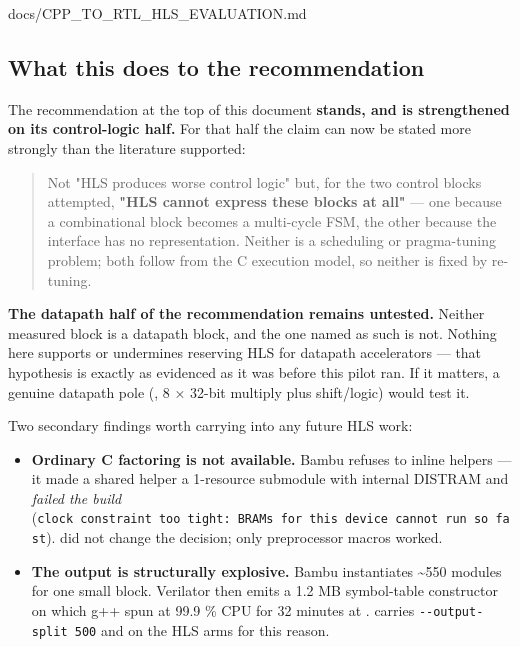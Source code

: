\begin{relocated}{docs/CPP_TO_RTL_HLS_EVALUATION.md}
\subsection{What this does to the recommendation}\label{tm:dec:cpp-to-rtl-hls-evaluation:what-this-does-to-the-recommendation}

The recommendation at the top of this document \textbf{stands, and is
strengthened on its control-logic half.} For that half the claim can now
be stated more strongly than the literature supported:

\begin{quote}
Not "HLS produces worse control logic" but, for the two control blocks
attempted, \textbf{"HLS cannot express these blocks at all"} --- one
because a combinational block becomes a multi-cycle FSM, the other
because the interface has no representation. Neither is a scheduling or
pragma-tuning problem; both follow from the C execution model, so
neither is fixed by re-tuning.
\end{quote}

\textbf{The datapath half of the recommendation remains untested.}
Neither measured block is a datapath block, and the one named as such is
not. Nothing here supports or undermines reserving HLS for datapath
accelerators --- that hypothesis is exactly as evidenced as it was
before this pilot ran. If it matters, a genuine datapath pole
(, 8 × 32-bit multiply plus
shift/\allowbreak{}logic) would test it.

Two secondary findings worth carrying into any future HLS work:

\begin{itemize}
\tightlist
\item
  \textbf{Ordinary C factoring is not available.} Bambu refuses to
  inline  helpers --- it made a shared helper a 1-resource
  submodule with internal DISTRAM and \emph{failed the build}
  (\texttt{clock\ constraint\ too\ tight:\allowbreak{}\ BRAMs\ for\ this\ device\ cannot\ run\ so\ fast}).
   did not change the decision;
  only preprocessor macros worked.
\item
  \textbf{The output is structurally explosive.} Bambu instantiates
  \textasciitilde550 modules for one small block. Verilator then emits a
  1.2 MB symbol-table constructor on which g++ spun at 99.9 \% CPU for
  32 minutes at .  carries
  \texttt{-\allowbreak{}-\allowbreak{}output-\allowbreak{}split\ 500}
  and  on the HLS arms for this reason.
\end{itemize}


\end{relocated}
